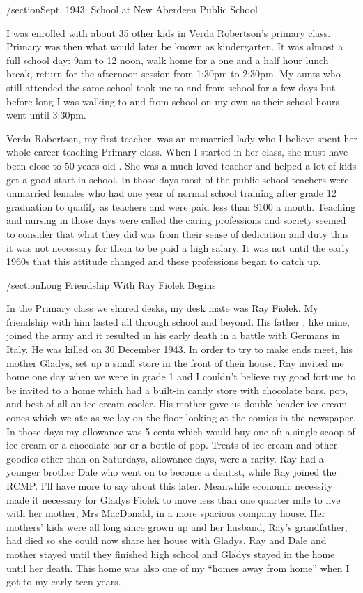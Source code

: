 /section{Sept. 1943: School at New Aberdeen Public School}

I was enrolled with about 35 other kids in Verda Robertson's primary class. Primary was then what would later be known as kindergarten. It was almost a full school day: 9am to 12 noon, walk home for a one and a half hour lunch break, return for the afternoon session from 1:30pm to 2:30pm. My aunts who still attended the same school took me to and from school for a few days but before long I was walking to and from school on my own as their school hours went until 3:30pm.

Verda Robertson, my first teacher, was an unmarried lady who I believe spent her whole career teaching Primary class. When I started in her class, she must have been close to 50 years old . She was a much loved teacher and helped a lot of kids get a good start in school. In those days most of the public school teachers were unmarried females who had one year of normal school training after grade 12 graduation to qualify as teachers and were paid less than \$100 a month. Teaching and nursing in those days were called the caring professions and society seemed to consider that what they did was from their sense of dedication and duty thus it was not necessary for them to be paid a high salary. It was not until the early 1960s that this attitude changed and these professions began to catch up.

/section{Long Friendship With Ray Fiolek Begins}

In the Primary class we shared desks, my desk mate was Ray Fiolek. My friendship with him lasted all through school and beyond. His father , like mine, joined the army and it resulted in his early death in a battle with Germans in Italy. He was killed on 30 December 1943. In order to try to make ends meet, his mother Gladys, set up a small store in the front of their house. Ray invited me home one day when we were in grade 1 and I couldn't believe my good fortune to be invited to a home which had a built-in candy store with chocolate bars, pop, and best of all an ice cream cooler. His mother gave us double header ice cream cones which we ate as we lay on the floor looking at the comics in the newspaper. In those days my allowance was 5 cents which would buy one of: a single scoop of ice cream or a chocolate bar or a bottle of pop. Treats of ice cream and other goodies other than on Saturdays, allowance days, were a rarity. Ray had a younger brother Dale who went on to become a dentist, while Ray joined the RCMP. I'll have more to say about this later. Meanwhile economic necessity made it necessary for Gladys Fiolek to move less than one quarter mile to live with her mother, Mrs MacDonald, in a more spacious company house. Her mothers' kids were all long since grown up and her husband, Ray's grandfather, had died so she could now share her house with Gladys. Ray and Dale and mother stayed until they finished high school and Gladys stayed in the home until her death. This home was also one of my “homes away from home” when I got to my early teen years. 

